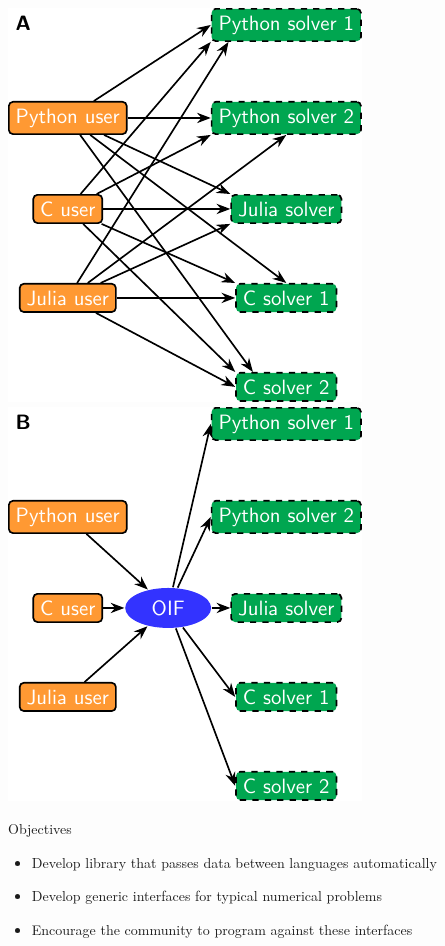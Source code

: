 \documentclass[a0paper, twocolumn, csc, english, final]{mpi2015_poster}
\begin{document}
\begin{poster}
\begin{pcolumn}
\begin{pbox}
      \includegraphics[width=0.46\columnwidth]{tikz/pairwise_bindings}
      \hfill
      \includegraphics[width=0.46\columnwidth]{tikz/oif_bindings}


      \begin{center}
        \begin{tcolorbox}[
            colback=white, colframe=mardiblue, parbox=true,
            left=1em, right=1em,
            before={\par\bigskip\noindent}, after={\par\bigskip},  width=\columnwidth]
          {\Large\color{mardiblue}Objectives\medskip}
          \begin{itemize}
            \item Develop library that passes data between languages automatically
            \item Develop generic interfaces for typical numerical problems
            \item Encourage the community to program against these interfaces
          \end{itemize}
        \end{tcolorbox}
      \end{center}


\end{pbox}
\end{pcolumn}
\end{poster}
\end{document}
